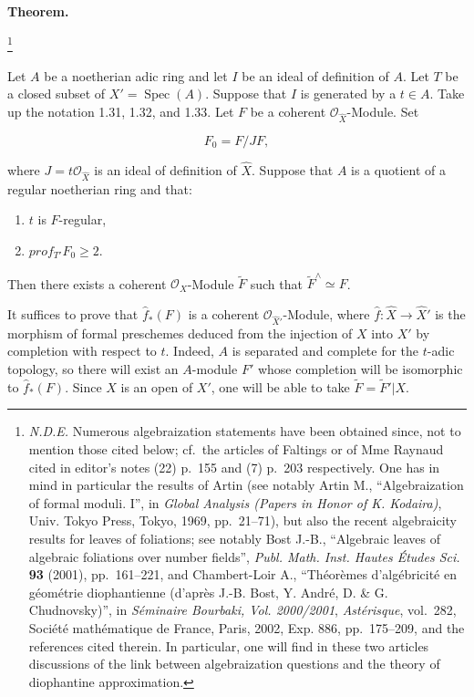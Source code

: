 \documentclass[
  11pt,
  a4paper,
]{book}
\begin{document}
\textbf{Theorem.}

\footnote{\emph{N.D.E.} Numerous algebraization statements have been
  obtained since, not to mention those cited below; cf.~the articles of
  Faltings or of Mme Raynaud cited in editor's notes (22) p.~155 and (7)
  p.~203 respectively. One has in mind in particular the results of
  Artin (see notably Artin M., ``Algebraization of formal moduli. I'',
  in \emph{Global Analysis (Papers in Honor of K. Kodaira)}, Univ. Tokyo
  Press, Tokyo, 1969, pp.~21--71), but also the recent algebraicity
  results for leaves of foliations; see notably Bost J.-B., ``Algebraic
  leaves of algebraic foliations over number fields'', \emph{Publ. Math.
  Inst. Hautes Études Sci.} \textbf{93} (2001), pp.~161--221, and
  Chambert-Loir A., ``Théorèmes d'algébricité en géométrie diophantienne
  (d'après J.-B. Bost, Y. André, D. \& G. Chudnovsky)'', in
  \emph{Séminaire Bourbaki, Vol. 2000/2001}, \emph{Astérisque},
  vol.~282, Société mathématique de France, Paris, 2002, Exp. 886,
  pp.~175--209, and the references cited therein. In particular, one
  will find in these two articles discussions of the link between
  algebraization questions and the theory of diophantine approximation.}

Let \(A\) be a noetherian adic ring and let \(I\) be an ideal of
definition of \(A\). Let \(T\) be a closed subset of \(X' =
\operatorname{Spec}(A)\). Suppose that \(I\) is generated by a
\(t \in A\). Take up the notation 1.31, 1.32, and 1.33. Let \(F\) be a
coherent \(\mathcal{O}_{\hat{X}}\)-Module. Set

\[ F_{0} = F/J F, \]

where \(J = t\mathcal{O}_{\hat{X}}\) is an ideal of definition of
\(\hat{X}\). Suppose that \(A\) is a quotient of a regular noetherian
ring and that:

\begin{enumerate}
\def\labelenumi{(\arabic{enumi})}
\item
  \(t\) is \(F\)-regular,
\item
  \(prof_{T'} F_{0} \geqslant 2\).
\end{enumerate}

Then there exists a coherent \(\mathcal{O}_{X}\)-Module \(\tilde{F}\)
such that \(\tilde{F}^{\wedge} \simeq F\).

It suffices to prove that \(\hat{f}_{*}(F)\) is a coherent
\(\mathcal{O}_{\hat{X}'}\)-Module, where \(\hat{f}: \hat{X} \to
\hat{X}'\) is the morphism of formal preschemes deduced from the
injection of \(X\) into \(X'\) by completion with respect to \(t\).
Indeed, \(A\) is separated and complete for the \(t\)-adic topology, so
there will exist an \(A\)-module \(F'\) whose completion will be
isomorphic to \(\hat{f}_{*}(F)\). Since \(X\) is an open of \(X'\), one
will be able to take \(\tilde{F} =
\tilde{F}' | X\).
\end{document}
